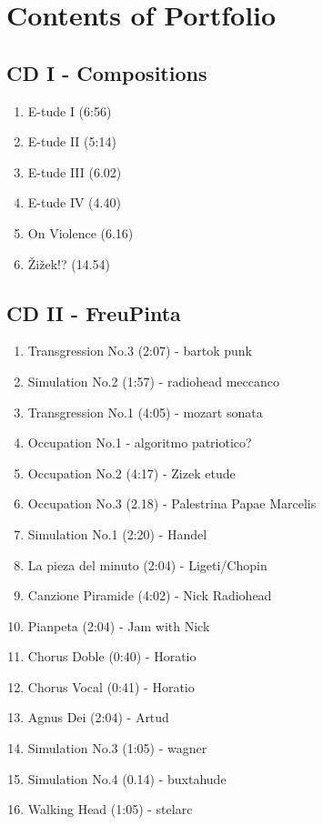 \chapter*{Contents of Portfolio}
\hypertarget{portfolio}{}

\section*{CD I - Compositions}

\begin{enumerate}
\item E-tude I (6:56)
\item E-tude II (5:14)
\item E-tude III (6.02)
\item E-tude IV (4.40)
\item On Violence (6.16)
\item \v{Z}i\v{z}ek!? (14.54)
\end{enumerate}

\section*{CD II - FreuPinta}

\begin{enumerate}
\item Transgression No.3 (2:07) - bartok punk
\item Simulation No.2 (1:57) - radiohead meccanco
\item Transgression No.1 (4:05) - mozart sonata
\item Occupation No.1 - algoritmo patriotico?
\item Occupation No.2 (4:17) - Zizek etude
\item Occupation No.3 (2.18) - Palestrina Papae Marcelis
\item Simulation No.1 (2:20) - Handel
\item La pieza del minuto (2:04) - Ligeti/Chopin
\item Canzione Piramide (4:02) - Nick Radiohead
\item Pianpeta (2:04) - Jam with Nick
\item Chorus Doble (0:40) - Horatio
\item Chorus Vocal (0:41) - Horatio
\item Agnus Dei (2:04) - Artud
\item Simulation No.3 (1:05) - wagner
\item Simulation No.4 (0.14) - buxtahude
\item Walking Head (1:05) - stelarc
\end{enumerate}

